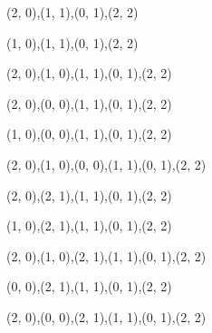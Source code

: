 \begin{figure}[H]
\begin{subfigure}[b]{0.13\textwidth}
    \resizebox{\linewidth}{!} {
       {{(2, 0),(1, 1),(0, 1),(2, 2)}} {{}}
    }
  \end{subfigure}
  \begin{subfigure}[b]{0.13\textwidth}
    \resizebox{\linewidth}{!} {
       {{(1, 0),(1, 1),(0, 1),(2, 2)}} {{}}
    }
  \end{subfigure}
  \begin{subfigure}[b]{0.13\textwidth}
    \resizebox{\linewidth}{!} {
       {{(2, 0),(1, 0),(1, 1),(0, 1),(2, 2)}} {{}}
    }
  \end{subfigure}
  \begin{subfigure}[b]{0.13\textwidth}
    \resizebox{\linewidth}{!} {
       {{(2, 0),(0, 0),(1, 1),(0, 1),(2, 2)}} {{}}
    }
  \end{subfigure}
  \begin{subfigure}[b]{0.13\textwidth}
    \resizebox{\linewidth}{!} {
       {{(1, 0),(0, 0),(1, 1),(0, 1),(2, 2)}} {{}}
    }
  \end{subfigure}
  \begin{subfigure}[b]{0.13\textwidth}
    \resizebox{\linewidth}{!} {
       {{(2, 0),(1, 0),(0, 0),(1, 1),(0, 1),(2, 2)}} {{}}
    }
  \end{subfigure}
  \begin{subfigure}[b]{0.13\textwidth}
    \resizebox{\linewidth}{!} {
       {{(2, 0),(2, 1),(1, 1),(0, 1),(2, 2)}} {{}}
    }
  \end{subfigure}
  \begin{subfigure}[b]{0.13\textwidth}
    \resizebox{\linewidth}{!} {
       {{(1, 0),(2, 1),(1, 1),(0, 1),(2, 2)}} {{}}
    }
  \end{subfigure}
  \begin{subfigure}[b]{0.13\textwidth}
    \resizebox{\linewidth}{!} {
       {{(2, 0),(1, 0),(2, 1),(1, 1),(0, 1),(2, 2)}} {{}}
    }
  \end{subfigure}
  \begin{subfigure}[b]{0.13\textwidth}
    \resizebox{\linewidth}{!} {
       {{(0, 0),(2, 1),(1, 1),(0, 1),(2, 2)}} {{}}
    }
  \end{subfigure}
  \begin{subfigure}[b]{0.13\textwidth}
    \resizebox{\linewidth}{!} {
       {{(2, 0),(0, 0),(2, 1),(1, 1),(0, 1),(2, 2)}} {{}}
    }
  \end{subfigure}
  \begin{subfigure}[b]{0.13\textwidth}

\end{subfigure}
\end{figure}
